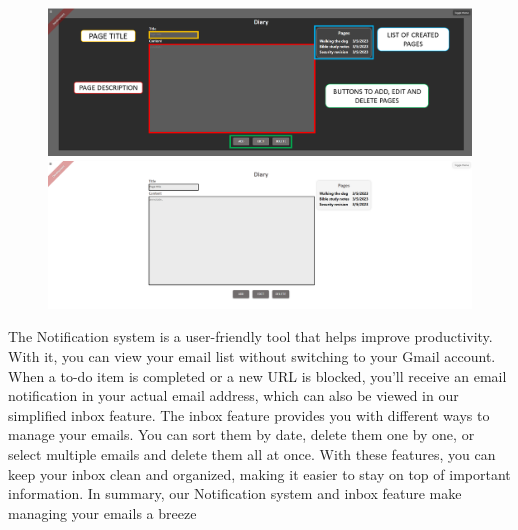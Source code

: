 \documentclass[a4paper]{article}
\begin{document}
\begin{figure}[H]
  \centering
  \begin{minipage}{0.49\textwidth}
    \centering
    \includegraphics[width=\linewidth]{./image/Diary_1.png}
  \end{minipage}\hfill
  \begin{minipage}{0.49\textwidth}
    \centering
    \includegraphics[width=\linewidth]{./image/Diary_2.png}
  \end{minipage}
\end{figure}

The Notification system is a user-friendly tool that helps improve productivity. With it, you can view your email list without switching to your Gmail account. When a to-do item is completed or a new URL is blocked, you'll receive an email notification in your actual email address, which can also be viewed in our simplified inbox feature. The inbox feature provides you with different ways to manage your emails. You can sort them by date, delete them one by one, or select multiple emails and delete them all at once. With these features, you can keep your inbox clean and organized, making it easier to stay on top of important information. In summary, our Notification system and inbox feature make managing your emails a breeze
\end{document}
